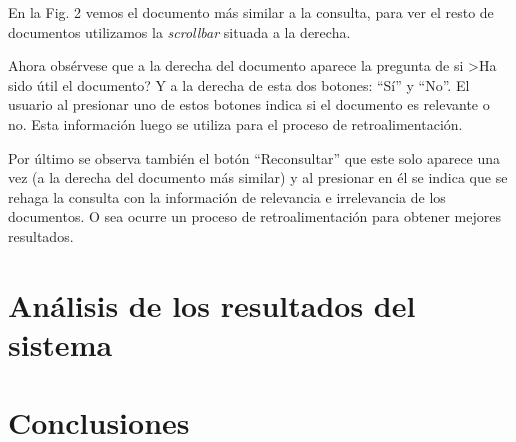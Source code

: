 \documentclass[runningheads]{llncs}
\begin{document}
	En la Fig. 2 vemos el documento m\'as similar a la consulta, para ver el resto de documentos utilizamos la \textit{scrollbar} situada a la derecha.
	
	Ahora obs\'ervese que a la derecha del documento aparece la pregunta de si >Ha sido \'util el documento? Y a la derecha de esta dos botones: ``S\'i'' y ``No''. El usuario al presionar uno de estos botones indica si el documento es relevante o no. Esta informaci\'on luego se utiliza para el proceso de retroalimentaci\'on.
	
	Por \'ultimo se observa tambi\'en el bot\'on ``Reconsultar'' que este solo aparece una vez (a la derecha del documento m\'as similar) y al presionar en \'el se indica que se rehaga la consulta con la informaci\'on de relevancia e irrelevancia de los documentos. O sea ocurre un proceso de retroalimentaci\'on para obtener mejores resultados.
	
	\section{An\'alisis de los resultados del sistema}
	
	
	\section{Conclusiones}
	
	
	
	\begin{thebibliography}{1}
		
	\end{thebibliography}
\end{document}
